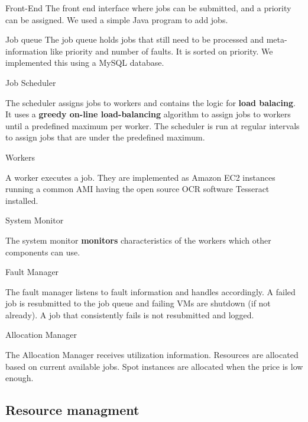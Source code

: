 \documentclass[a4paper]{IEEEtran}
\begin{document}
\begin{LaTeXdescription}

\item[Front-End] The front end interface where jobs can be submitted, and a priority can be assigned. We used a simple Java program to add jobs.

\item[Job queue] The job queue holds jobs that still need to be processed and meta-information like priority and number of faults. It is sorted on priority. We implemented this using a MySQL database.

\item[Job Scheduler]

The scheduler assigns jobs to workers and contains the logic for \textbf{load balacing}. It uses a \textbf{greedy on-line load-balancing} algorithm \cite{kleinberg2006} to assign jobs to workers until a predefined maximum per worker. The scheduler is run at regular intervals to assign jobs that are under the predefined maximum.

\item[Workers]

A worker executes a job. They are implemented as Amazon EC2 instances running a common AMI having the open source OCR software Tesseract installed.

\item[System Monitor]

The system monitor \textbf{monitors} characteristics of the workers which other components can use.

\item[Fault Manager]

The fault manager listens to fault information and handles accordingly. A failed job is resubmitted to the job queue and failing VMs are shutdown (if not already). A job that consistently fails is not resubmitted and logged.

\item[Allocation Manager]

The Allocation Manager receives utilization information. Resources are allocated based on current available jobs. Spot instances are allocated when the price is low enough.

\end{LaTeXdescription}

\subsection*{Resource managment}
\end{document}
